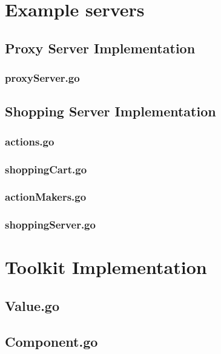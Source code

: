 \begin{appendices}
\section{Example servers}

\subsection{Proxy Server Implementation}
\subsubsection{proxyServer.go}


\newpage
\subsection{Shopping Server Implementation}
\subsubsection{actions.go}

\subsubsection{shoppingCart.go}

\subsubsection{actionMakers.go}

\newpage
\subsubsection{shoppingServer.go}


\newpage
\section{Toolkit Implementation}
\subsection{Value.go}

\subsection{Component.go}

\end{appendices}